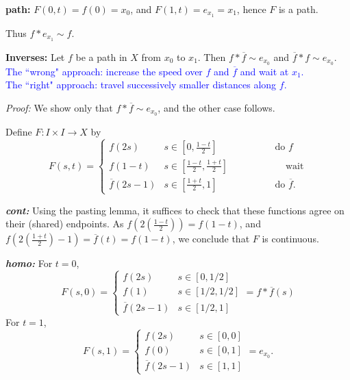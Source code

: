 \documentclass[12pt,letterpaper,boxed]{article}
\begin{document}
{\bf path:}
$F(0,t)=f(0)=x_0$, and $F(1,t)=e_{x_1}=x_1$, hence $F$ is a path.

\vspace{.2in}

Thus $f*e_{x_1}\sim f$.\qedsymbol

\vspace{.6in}

{\bf \large Inverses: } \normalsize Let $f$ be a path in $X$ from $x_0$ to $x_1$.  Then $f*\overline{f}\sim e_{x_0}$ and $\overline{f}*f\sim e_{x_0}$.\\ 
\vspace{.1in}
\textcolor{blue}{The ``wrong" approach:  increase the speed over $f$ and $\overline{f}$ and wait at $x_1$.\\
The ``right" approach: travel successively smaller distances along $f$.}


\emph{Proof:} \indent We show only that $f*\overline{f}\sim e_{x_0}$, and the other case follows.

Define $F:I\times I\to X$ by 
$$F(s,t)=\begin{cases} f(2s) & s\in [0,\tfrac{1-t}{2}] \hspace{1in} \text{do $f$}\\ f(1-t) & s\in [\tfrac{1-t}{2},\tfrac{1+t}{2}] \hspace{1in} \text{wait}\\ \overline{f}(2s-1) & s\in[\tfrac{1+t}{2}, 1] \hspace{1in} \text{do $\overline{f}$.}\end{cases}$$
\vspace{.6in}

\emph{\bf cont:} Using the pasting lemma, it suffices to check that these functions agree on their (shared) endpoints.  As $f(2(\tfrac{1-t}{2}))=f(1-t)$, and $f(2(\tfrac{1+t}{2})-1)=\overline{f}(t)=f(1-t)$, we conclude that $F$ is continuous.
\vspace{.6in}

\emph{\bf homo:} For $t=0$, $$F(s,0)=\begin{cases} f(2s) & s\in [0,1/2]\\ f(1) & s\in [1/2,1/2] \\ \overline{f}(2s-1) & s\in [1/2,1]\end{cases}=f*\overline{f}(s)$$
For $t=1$, $$F(s,1)=\begin{cases} f(2s) & s\in [0,0]\\ f(0) & s\in [0,1]\\ \overline{f}(2s-1) & s\in [1,1]\end{cases} =e_{x_0}.$$
\vspace{.6in}
\end{document}
